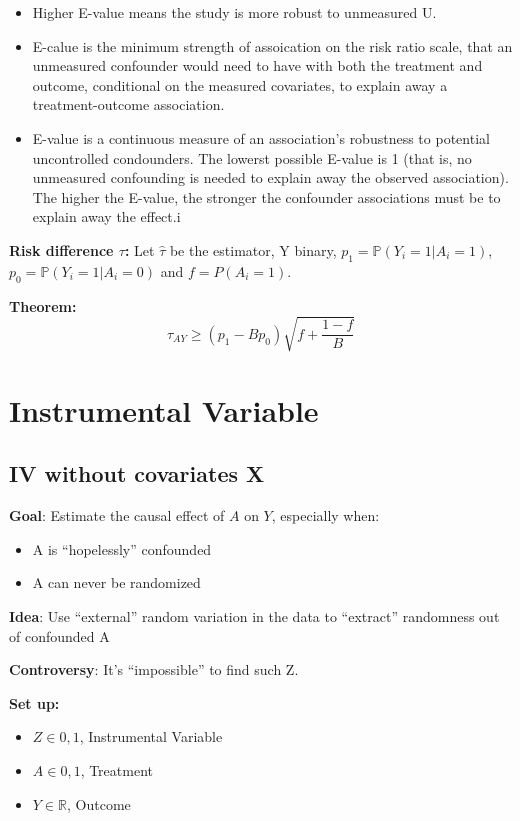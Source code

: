 \documentclass[
]{book}
\providecommand{\tightlist}{%
  \setlength{\itemsep}{0pt}\setlength{\parskip}{0pt}}
\begin{document}
\begin{itemize}
\tightlist
\item
  Higher E-value means the study is more robust to unmeasured U.
\item
  E-calue is the minimum strength of assoication on the risk ratio scale, that an unmeasured confounder would need to have with both the treatment and outcome, conditional on the measured covariates, to explain away a treatment-outcome association.
\item
  E-value is a continuous measure of an association's robustness to potential uncontrolled condounders. The lowerst possible E-value is 1 (that is, no unmeasured confounding is needed to explain away the observed association). The higher the E-value, the stronger the confounder associations must be to explain away the effect.i
\end{itemize}

\textbf{Risk difference \(\tau\):} Let \(\hat{\tau}\) be the estimator, Y binary, \(p_1 = \mathbb{P}(Y_i = 1|A_i=1)\), \(p_0 = \mathbb{P}(Y_i = 1|A_i=0)\) and \(f = P(A_i=1)\).

\textbf{Theorem:}
\[\tau_{AY} \geq (p_1 - Bp_0)\sqrt{f + \frac{1-f}{B}}\]

\hypertarget{iv}{%
\chapter{Instrumental Variable}\label{iv}}

\hypertarget{iv-without-covariates-x}{%
\section{IV without covariates X}\label{iv-without-covariates-x}}

\textbf{Goal}: Estimate the causal effect of \(A\) on \(Y\), especially when:

\begin{itemize}
\tightlist
\item
  A is ``hopelessly'' confounded
\item
  A can never be randomized
\end{itemize}

\textbf{Idea}: Use ``external'' random variation in the data to ``extract'' randomness out of confounded A

\textbf{Controversy}: It's ``impossible'' to find such Z.

\textbf{Set up:}

\begin{itemize}
\tightlist
\item
  \(Z \in {0,1}\), Instrumental Variable
\item
  \(A \in {0,1}\), Treatment
\item
  \(Y \in \mathbb{R}\), Outcome
\end{itemize}
\end{document}
